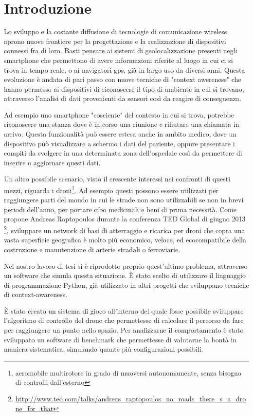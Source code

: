\chapter*{Introduzione}
Lo sviluppo e la costante diffusione di tecnologie di comunicazione wireless aprono nuove frontiere per la progettazione e la realizzazione di dispositivi connessi fra di loro. Basti pensare ai sistemi di geolocalizzazione presenti negli smartphone che permettono di avere informazioni riferite al luogo in cui ci si trova in tempo reale, o ai navigatori gps, già in largo uso da diversi anni. Questa evoluzione è andata di pari passo con nuove tecniche di "context awereness" che hanno permesso ai dispositivi di riconoscere il tipo di ambiente in cui si trovano, attraverso l'analisi di dati provenienti da sensori così da reagire di conseguenza. 

Ad esempio uno smartphone "cosciente" del contesto in cui si trova, potrebbe riconoscere una stanza dove è in corso una riunione e rifiutare una chiamata in arrivo. Questa funzionalità può essere estesa anche in ambito medico, dove un dispositivo può visualizzare a schermo i dati del paziente, oppure presentare i compiti da svolgere in una determinata zona dell'ospedale così da permettere di inserire o aggiornare questi dati. 

Un altro possibile scenario, visto il crescente interessi nei confronti di questi mezzi, riguarda i droni\footnote{aeromobile multirotore in grado di muoversi autonomamente, senza bisogno di controlli dall'esterno}. Ad esempio questi possono essere utilizzati per raggiungere parti del mondo in cui le strade non sono utilizzabili se non in brevi periodi dell'anno, per portare cibo medicinali e beni di prima necessità. Come propone Andreas Raptopoulos durante la conferenza TED Global di giugno 2013
\footnote{ \url{http://www.ted.com/talks/andreas_raptopoulos_no_roads_there_s_a_drone_for_that} }, sviluppare un network di basi di atterraggio e ricarica per droni che copra una vasta superficie geografica è molto più economico, veloce, ed ecocompatibile della costruzione e manutenzione di arterie stradali o ferroviarie.

Nel nostro lavoro di tesi si è riprodotto proprio quest'ultimo problema, attraverso un software che simula questa situazione. È stato scelto di utilizzare il linguaggio di programmazione Python, già utilizzato in altri progetti che sviluppano tecniche di context-awareness.

È stato creato un sistema di gioco all'interno del quale fosse possibile sviluppare l'algoritmo di controllo del drone che permettesse di calcolare il percorso da fare per raggiungere un punto nello spazio. Per analizzarne il comportamento è stato sviluppato un software di benchmark che permettesse di valutarne la bontà in maniera sistematica, simulando quante più configurazioni possibili.


